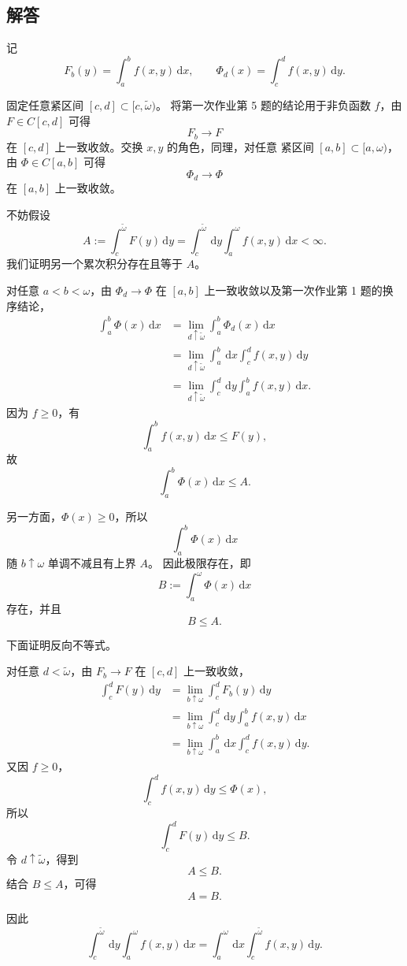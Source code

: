 \documentclass[12pt,a4paper]{ctexart}
\newcommand{\dd}{\,\mathrm d}
\begin{document}
\subsection*{解答}

记
\[
F_b(y)=\int_a^b f(x,y)\dd x,
\qquad
\Phi_d(x)=\int_c^d f(x,y)\dd y.
\]

固定任意紧区间 \([c,d]\subset[c,\widetilde\omega)\)。
将第一次作业第 5 题的结论用于非负函数 \(f\)，由
\(F\in C[c,d]\) 可得
\[
F_b\longrightarrow F
\]
在 \([c,d]\) 上一致收敛。交换 \(x,y\) 的角色，同理，对任意
紧区间 \([a,b]\subset[a,\omega)\)，由 \(\Phi\in C[a,b]\) 可得
\[
\Phi_d\longrightarrow\Phi
\]
在 \([a,b]\) 上一致收敛。

不妨假设
\[
A
:=
\int_c^{\widetilde\omega}F(y)\dd y
=
\int_c^{\widetilde\omega}
\dd y
\int_a^\omega f(x,y)\dd x
<\infty.
\]
我们证明另一个累次积分存在且等于 \(A\)。

对任意 \(a<b<\omega\)，由 \(\Phi_d\to\Phi\) 在
\([a,b]\) 上一致收敛以及第一次作业第 1 题的换序结论，
\begin{align*}
\int_a^b\Phi(x)\dd x
&=
\lim_{d\uparrow\widetilde\omega}
\int_a^b\Phi_d(x)\dd x\\
&=
\lim_{d\uparrow\widetilde\omega}
\int_a^b\dd x\int_c^d f(x,y)\dd y\\
&=
\lim_{d\uparrow\widetilde\omega}
\int_c^d\dd y\int_a^b f(x,y)\dd x.
\end{align*}
因为 \(f\ge0\)，有
\[
\int_a^b f(x,y)\dd x
\le
F(y),
\]
故
\[
\int_a^b\Phi(x)\dd x
\le A.
\]

另一方面，\(\Phi(x)\ge0\)，所以
\[
\int_a^b\Phi(x)\dd x
\]
随 \(b\uparrow\omega\) 单调不减且有上界 \(A\)。
因此极限存在，即
\[
B
:=
\int_a^\omega\Phi(x)\dd x
\]
存在，并且
\[
B\le A.
\]

下面证明反向不等式。

对任意 \(d<\widetilde\omega\)，由
\(F_b\to F\) 在 \([c,d]\) 上一致收敛，
\begin{align*}
\int_c^dF(y)\dd y
&=
\lim_{b\uparrow\omega}
\int_c^dF_b(y)\dd y\\
&=
\lim_{b\uparrow\omega}
\int_c^d\dd y\int_a^b f(x,y)\dd x\\
&=
\lim_{b\uparrow\omega}
\int_a^b\dd x\int_c^d f(x,y)\dd y.
\end{align*}
又因 \(f\ge0\)，
\[
\int_c^d f(x,y)\dd y
\le
\Phi(x),
\]
所以
\[
\int_c^dF(y)\dd y
\le
B.
\]
令 \(d\uparrow\widetilde\omega\)，得到
\[
A\le B.
\]
结合 \(B\le A\)，可得
\[
A=B.
\]

因此
\[
\boxed{
\int_c^{\widetilde\omega}
\dd y
\int_a^\omega f(x,y)\dd x
=
\int_a^\omega
\dd x
\int_c^{\widetilde\omega}f(x,y)\dd y.
}
\]
\end{document}
